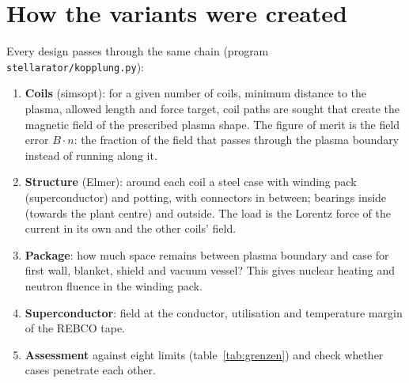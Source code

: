 \documentclass[10pt,a4paper]{article}
\begin{document}
\section{How the variants were created}\label{sec:kette}
Every design passes through the same chain (program \texttt{stellarator/kopplung.py}):
\begin{enumerate}\itemsep1pt
\item \textbf{Coils} (simsopt): for a given number of coils, minimum distance to the plasma, allowed length and force
target, coil paths are sought that create the magnetic field of the prescribed plasma shape. The figure of merit is
the field error $B\cdot n$: the fraction of the field that passes through the plasma boundary instead of running along
it.
\item \textbf{Structure} (Elmer): around each coil a steel case with winding pack (superconductor) and potting, with
connectors in between; bearings inside (towards the plant centre) and outside. The load is the Lorentz force of the
current in its own and the other coils' field.
\item \textbf{Package}: how much space remains between plasma boundary and case for first wall, blanket, shield and
vacuum vessel? This gives nuclear heating and neutron fluence in the winding pack.
\item \textbf{Superconductor}: field at the conductor, utilisation and temperature margin of the REBCO tape.
\item \textbf{Assessment} against eight limits (table~\ref{tab:grenzen}) and check whether cases penetrate each other.
\end{enumerate}

\begin{table}[H]\centering\small
\caption{Limits against which every design is checked.}\label{tab:grenzen}\end{table}
\end{document}
